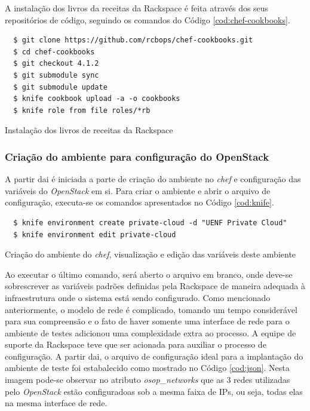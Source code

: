 A instalação dos livros da receitas da Rackspace é feita através dos seus repositórios
de código, seguindo os comandos do Código \ref{cod:chef-cookbooks}.

\begin{listing}
\begin{verbatim}
  $ git clone https://github.com/rcbops/chef-cookbooks.git
  $ cd chef-cookbooks
  $ git checkout 4.1.2
  $ git submodule sync
  $ git submodule update
  $ knife cookbook upload -a -o cookbooks
  $ knife role from file roles/*rb
\end{verbatim}
\caption{Instalação dos livros de receitas da Rackspace}
\label{cod:chef-cookbooks}
\end{listing}

\subsubsection{Criação do ambiente para configuração do OpenStack}

A partir dai é iniciada a parte de criação do ambiente no \emph{chef} e
configuração das variáveis do \emph{OpenStack} em si. Para criar o ambiente e
abrir o arquivo de configuração, executa-se os comandos apresentados no Código
\ref{cod:knife}.

\begin{listing}
\begin{verbatim}
  $ knife environment create private-cloud -d "UENF Private Cloud"
  $ knife environment edit private-cloud
\end{verbatim}
\caption{Criação do ambiente do \emph{chef}, visualização e edição das variáveis
 deste ambiente}
\label{cod:knife}
\end{listing}

Ao executar o último comando, será aberto o arquivo em branco, onde deve-se
sobrescrever as variáveis padrões definidas pela Rackspace de maneira
adequada à infraestrutura onde o sistema está sendo configurado. Como mencionado
anteriormente, o modelo de rede é complicado, tomando um tempo considerável para
sua compreensão e o fato de haver somente uma interface de rede para o ambiente
de testes adicionou uma complexidade extra ao processo. A equipe de suporte
da Rackspace teve que ser acionada para auxiliar o processo de configuração.
A partir dai, o arquivo de configuração ideal para a implantação do ambiente
de teste foi estabalecido como mostrado no Código \ref{cod:json}. Nesta imagem
pode-se observar no atributo \emph{osop\_networks} que as 3 redes utilizadas
pelo \emph{OpenStack} estão configuradoas sob a mesma faixa de IPs, ou seja,
todas elas na mesma interface de rede.

